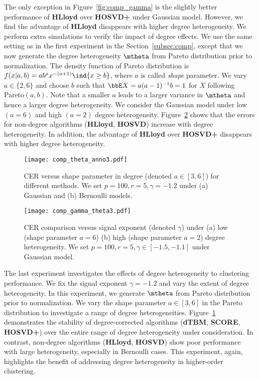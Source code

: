 \documentclass[lettersize,onecolumn,journal]{IEEEtran}
\theoremstyle{definition}
\theoremstyle{definition}
\begin{document}
The only exception in Figure~\ref{fig:comp_gamma} is the slightly better performance of \textbf{\small HLloyd} over \textbf{\small HOSVD+} under Gaussian model. However, we find the advantage of \textbf{\small HLloyd} disappears with higher degree heterogeneity. We perform extra simulations to verify the impact of degree effects. We use the same setting as in the first experiment in the Section~\ref{subsec:comp}, except that we now generate the degree heterogeneity $\mtheta$ from Pareto distribution prior to normalization. The density function of Pareto distribution is $f(x|a,b) = a b^a x^{-(a+1)} \ind\{ x \geq b \}$, where $a$ is called \emph{shape} parameter. We vary $a \in \{2,6\}$ and choose $b$ such that $\bbE X = a(a - 1)^{-1}b = 1$ for $X$ following Pareto$(a,b)$. Note that a smaller $a$ leads to a larger variance in $\mtheta$ and hence a larger degree heterogeneity. We consider the Gaussian model under low $(a = 6)$ and high $(a = 2)$ degree heterogeneity. Figure~\ref{fig:comp_gamma_theta} shows that the errors for non-degree algorithms (\textbf{\small HLloyd}, \textbf{\small HOSVD}) increase with degree heterogeneity. In addition, the advantage of \textbf{\small HLloyd} over \textbf{\small HOSVD+} disappears with higher degree heterogeneity. 



\begin{figure}[h!]
    \centering
    \texttt{[image: comp\_theta\_anno3.pdf]}
    \caption{CER versus shape parameter in degree (denoted $a\in[3,6]$) for different methods. We set $p = 100, r = 5, \gamma = -1.2$ under (a) Gaussian and (b) Bernoulli models.}
    \label{fig:comp_theta}
\end{figure}



\begin{figure}[htp!]
    \centering
    \texttt{[image: comp\_gamma\_theta3.pdf]}
    \caption{CER comparison versus signal exponent (denoted $\gamma$) under (a) low (shape parameter $a = 6$)  (b) high (shape parameter $a = 2$) degree heterogeneity. We set $p = 100, r = 5, \gamma \in [-1.5, -1.1]$ under Gaussian model.}
    \label{fig:comp_gamma_theta}
\end{figure}

The last experiment investigates the effects of degree heterogeneity to clustering performance. We fix the signal exponent $\gamma = -1.2$ and vary the extent of degree heterogeneity. In this experiment, we generate $\mtheta$ from Pareto distribution prior to normalization. We vary the shape parameter $a \in [3,6]$ in the Pareto distribution to investigate a range of degree heterogeneities. Figure~\ref{fig:comp_theta} demonstrates the stability of degree-corrected algorithms (\textbf{\small dTBM}, \textbf{\small SCORE}, \textbf{\small HOSVD+}) over the entire range of degree heterogeneity under consideration. In contrast, non-degree algorithms (\textbf{\small HLloyd}, \textbf{\small HOSVD}) show poor performance with large heterogeneity, especially in Bernoulli cases. This experiment, again, highlights the benefit of addressing degree heterogeneity in higher-order clustering. 
\end{document}

